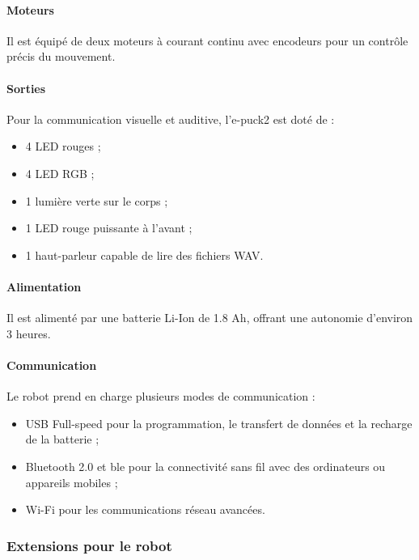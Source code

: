 \paragraph{Moteurs} Il est équipé de deux moteurs à courant continu avec encodeurs pour un contrôle précis du mouvement.  

\paragraph{Sorties} Pour la communication visuelle et auditive, l'e-puck2 est doté de : 
\begin{itemize}
    \item 4 LED rouges ;
    \item 4 LED RGB ;
    \item 1 lumière verte sur le corps ;
    \item 1 LED rouge puissante à l'avant ;
    \item 1 haut-parleur capable de lire des fichiers WAV.
\end{itemize}

\paragraph{Alimentation} Il est alimenté par une batterie Li-Ion de 1.8 Ah, offrant une autonomie d'environ 3 heures.

\paragraph{Communication} Le robot prend en charge plusieurs modes de communication : 
\begin{itemize} 
    \item USB Full-speed pour la programmation, le transfert de données et la recharge de la batterie ;
    \item Bluetooth 2.0 et \acrfull{ble} pour la connectivité sans fil avec des ordinateurs ou appareils mobiles ;
    \item Wi-Fi pour les communications réseau avancées.
\end{itemize}

\subsubsection{Extensions pour le robot}

